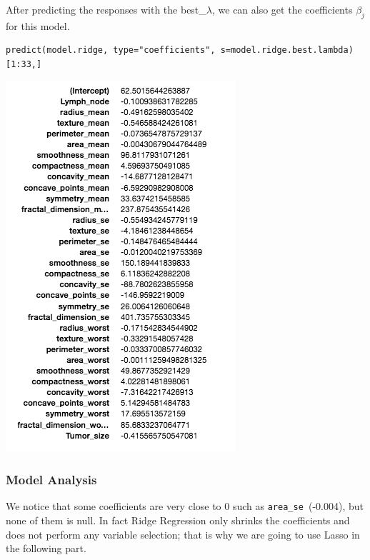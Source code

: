 \documentclass[]{report}
\begin{document}
After predicting the responses with the best\_$\lambda$,  we can also get the coefficients $\beta_{j}$ for this model.

\begin{lstlisting}
predict(model.ridge, type="coefficients", s=model.ridge.best.lambda)[1:33,]
\end{lstlisting}

\begin{center}
	\includegraphics[width=0.8\linewidth]{Figures/ridge_coeff}
\end{center}

\subsubsection{Model Analysis} \label{Ridge Model Analysis}
We notice that some coefficients are very close to 0 such as \texttt{area\_se }(-0.004), but none of them is null. In fact Ridge Regression only shrinks the coefficients and does not perform any variable selection;  that is why we are going to use Lasso in the following part.\\
\end{document}
